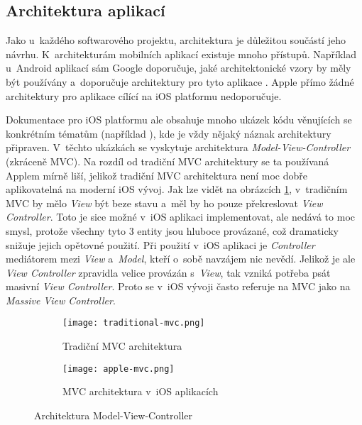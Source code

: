 \subsection{Architektura aplikací}\label{app-architecture}

Jako u~každého softwarového projektu, architektura je důležitou součástí jeho návrhu. K~architekturám mobilních aplikací existuje mnoho přístupů. Například u~Android aplikací sám Google doporučuje, jaké architektonické vzory by měly být používány a~doporučuje architektury pro tyto aplikace \cite{android-app-arch}. Apple přímo žádné architektury pro aplikace cílící na iOS platformu nedoporučuje. 

Dokumentace pro iOS platformu ale obsahuje mnoho ukázek kódu věnujících se konkrétním tématům (například \cite{swift-ui-tutorial-complex-interfaces}), kde je vždy nějaký náznak architektury připraven. V~těchto ukázkách se vyskytuje architektura \emph{Model-View-Controller} (zkráceně MVC). Na rozdíl od tradiční MVC architektury se ta používaná Applem mírně liší, jelikož tradiční MVC architektura není moc dobře aplikovatelná na moderní iOS vývoj. Jak lze vidět na obrázcích \ref{fig:mvc}, v~tradičním MVC by mělo \emph{View} být beze stavu a~měl by ho pouze překreslovat \emph{View Controller}. Toto je sice možné v~iOS aplikaci implementovat, ale nedává to moc smysl, protože všechny tyto 3 entity jsou hluboce provázané, což dramaticky snižuje jejich opětovné použití. Při použití v~iOS aplikaci je \emph{Controller} mediátorem mezi \emph{View} a~\emph{Model}, kteří o~sobě navzájem nic nevědí. Jelikož je ale \emph{View Controller} zpravidla velice provázán s~\emph{View}, tak vzniká potřeba psát masivní \emph{View Controller}. Proto se v~iOS vývoji často referuje na MVC jako na \emph{Massive View Controller}.

\begin{figure}[h]
	\centering
	\begin{subfigure}[b]{0.35\textwidth}
		\centering
		\texttt{[image: traditional-mvc.png]}
		\caption{Tradiční MVC architektura}
	\end{subfigure}
	\hspace{1cm}
	\begin{subfigure}[b]{0.45\textwidth}
		\centering
		\texttt{[image: apple-mvc.png]}
		\caption{MVC architektura v~iOS aplikacích}
	\end{subfigure}
	\caption{Architektura Model-View-Controller \cite{ios-architecture-patterns}}
	\label{fig:mvc}
\end{figure}

